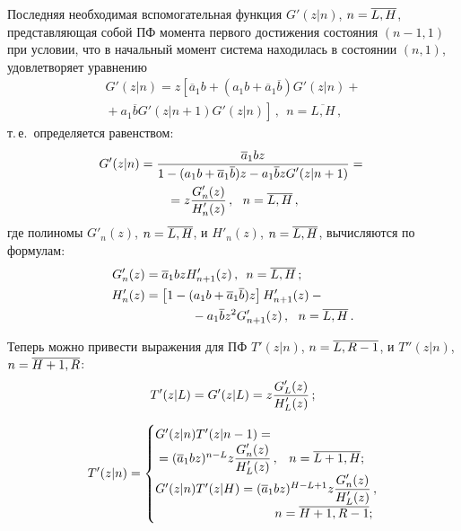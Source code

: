\begin{multicols}{2}
Последняя необходимая вспомогательная функция
$G'(z|n)$, $n\hm=\overline{L,H}$, представляющая собой
ПФ момента первого достижения состояния $(n-1,1)$
при условии, что в начальный момент сис\-те\-ма
находилась в состоянии $(n,1)$, удовлетворяет уравнению
\begin{multline*}
G'(z|n) = z \left[ \overline{a}_1 b +
(a_1 b + \overline{a}_1 \overline{b}) G'(z|n) + {}\right.\\
\left.{}+a_1 \overline{b}
G'(z|n+1) G'(z|n) \right]\,,\ \ n=\overline{L,H}\,,
\end{multline*}
т.\,е.\ определяется равенством:
\begin{multline*}
G'(z|n) = \displaystyle\frac{\displaystyle  \overline{a}_1 b z \mathstrut}{\displaystyle 1 - (a_1 b + \overline{a}_1 \overline{b}) z
- a_1 \overline{b} z G'(z|n+1) \mathstrut} ={}\\
{}=
z \displaystyle\frac{\displaystyle G'_{n}(z)\mathstrut}{\displaystyle H'_{n}(z)\mathstrut}\,,\ \ n=\overline{L,H}\,,
\end{multline*}
где полиномы $G'_{n}(z)$, $n\hm=\overline{L,H}$,
и $H'_{n}(z)$, $n\hm=\overline{L,H}$, вычисляются по формулам:
\begin{align*}
G'_n(z) &= \overline{a}_1 b z  H'_{n+1}(z)\, ,\enskip n=\overline{L,H}\,;
\\
H'_{n}(z)
&= \left[ 1 - (a_1 b + \overline{a}_1 \overline{b}) z
\right] H'_{n+1}(z) -{}\\
&\hspace*{13mm}{}- a_1 \overline{b} z^2 G'_{n+1}(z)\,,\ \ n=\overline{L,H}\,.
\end{align*}

Теперь можно привести выражения для
ПФ $T'(z|n)$, $n\hm=\overline{L,R-1}$,
и $T''(z|n)$, ${n\hm=\overline{H+1,R}}$:
\begin{equation*}
T'(z|L) = G'(z|L) = z \displaystyle\frac{\displaystyle G'_{L}(z)\mathstrut}{\displaystyle  H'_{L}(z)\mathstrut}\,;
\end{equation*}

\vspace*{-12pt}

\noindent
\begin{equation*}
T'(z|n) =
\begin{cases}
G'(z|n) T'(z|n-1) ={}\\
{}= (\overline{a}_1 b z)^{n-L}
z \fr{G'_{n}(z) }{H'_{L}(z)} \,, &\hspace*{-28mm}
n=\overline{L+1,H};
\\
G'(z|n) T'(z|H) = (\overline{a}_1 b z)^{H-L+1}
z \fr{G'_{n}(z)}{H'_{L}(z)} \,, &\\
&\hspace*{-32mm} n=\overline{H+1,R-1};
\end{cases}\hspace*{-9.86768pt}
\end{equation*}


\end{multicols}
